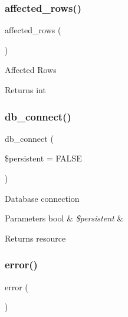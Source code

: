 \subsubsection{\texorpdfstring{affected\+\_\+rows()}{affected\_rows()}}
{\footnotesize\ttfamily affected\+\_\+rows (\begin{DoxyParamCaption}{ }\end{DoxyParamCaption})}

Affected Rows

\begin{DoxyReturn}{Returns}
int 
\end{DoxyReturn}
\mbox{\label{class_c_i___d_b__postgre__driver_a52bf595e79e96cc0a7c907a9b45aeb4d}} 
\subsubsection{\texorpdfstring{db\+\_\+connect()}{db\_connect()}}
{\footnotesize\ttfamily db\+\_\+connect (\begin{DoxyParamCaption}\item[{}]{\$persistent = {\ttfamily FALSE} }\end{DoxyParamCaption})}

Database connection


\begin{DoxyParams}[1]{Parameters}
bool & {\em \$persistent} & \\
\hline
\end{DoxyParams}
\begin{DoxyReturn}{Returns}
resource 
\end{DoxyReturn}
\mbox{\label{class_c_i___d_b__postgre__driver_a43b8d30b879d4f09ceb059b02af2bc02}} 
\subsubsection{\texorpdfstring{error()}{error()}}
{\footnotesize\ttfamily error (\begin{DoxyParamCaption}{ }\end{DoxyParamCaption})}

